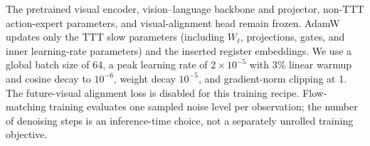 The pretrained visual encoder, vision--language backbone and projector, non-TTT action-expert parameters, and visual-alignment head remain frozen. AdamW updates only the TTT slow parameters (including $W_\ell$, projections, gates, and inner learning-rate parameters) and the inserted register embeddings. We use a global batch size of 64, a peak learning rate of $2\times10^{-5}$ with 3\% linear warmup and cosine decay to $10^{-6}$, weight decay $10^{-5}$, and gradient-norm clipping at 1. The future-visual alignment loss is disabled for this training recipe. Flow-matching training evaluates one sampled noise level per observation; the number of denoising steps is an inference-time choice, not a separately unrolled training objective.

